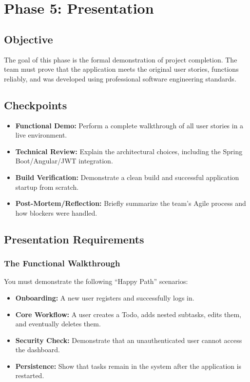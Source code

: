\newpage
\section{Phase 5: Presentation}\label{sec:phase5}

\subsection{Objective}
The goal of this phase is the formal demonstration of project completion. The team must prove that
the application meets the original user stories, functions reliably, and was developed using
professional software engineering standards.

\subsection{Checkpoints}
\begin{itemize}
  \item[$\square$] \textbf{Functional Demo:} Perform a complete walkthrough of all user stories in a live environment.
  \item[$\square$] \textbf{Technical Review:} Explain the architectural choices, including the Spring Boot/Angular/JWT integration.
  \item[$\square$] \textbf{Build Verification:} Demonstrate a clean build and successful application startup from scratch.
  \item[$\square$] \textbf{Post-Mortem/Reflection:} Briefly summarize the team's Agile process and how blockers were handled.
\end{itemize}

\subsection{Presentation Requirements}

\subsubsection{The Functional Walkthrough}
You must demonstrate the following ``Happy Path'' scenarios:
\begin{itemize}
  \item \textbf{Onboarding:} A new user registers and successfully logs in.
  \item \textbf{Core Workflow:} A user creates a Todo, adds nested subtasks, edits them, and eventually deletes them.
  \item \textbf{Security Check:} Demonstrate that an unauthenticated user cannot access the dashboard.
  \item \textbf{Persistence:} Show that tasks remain in the system after the application is restarted.
\end{itemize}

